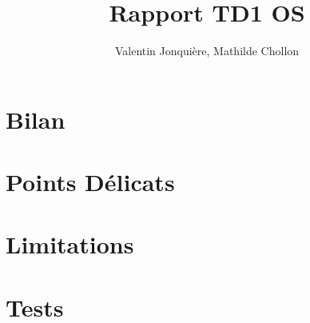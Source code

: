 \documentclass{article}
\author{
    Valentin Jonquière,
    Mathilde Chollon
}
\title{Rapport TD1 OS}
\begin{document}
\maketitle

\pagebreak

\tableofcontents

\pagebreak

\section{Bilan}


\section{Points Délicats}


\section{Limitations}


\section{Tests}
\end{document}
